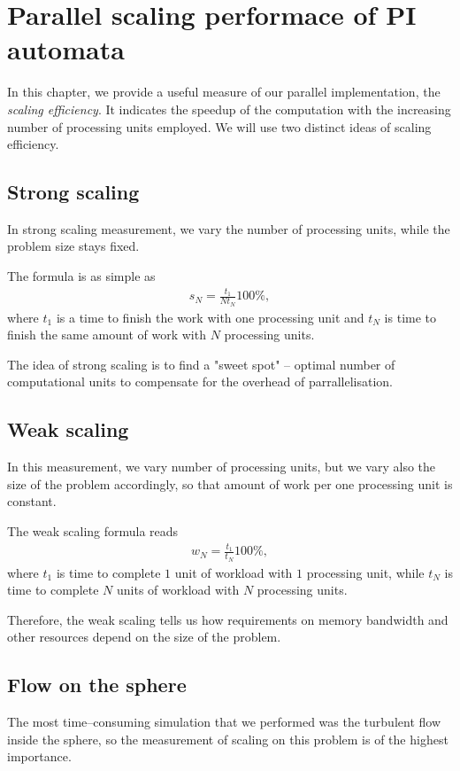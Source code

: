 \chapter{Parallel scaling performace of PI automata}
In this chapter, we provide a useful measure of our parallel implementation, the \textit{scaling efficiency}. It indicates the speedup of the computation with the increasing number of processing units employed.
We will use two distinct ideas of scaling efficiency.

\section{Strong scaling}
In strong scaling measurement, we vary the number of processing units, while the problem size stays fixed.

The formula is as simple as
\begin{align*}
s_N = \frac{t_1}{N t_N} 100\%,
\end{align*}
where $t_1$ is a time to finish the work with one processing unit and $t_N$ is time to finish the same amount of work with $N$ processing units.

The idea of strong scaling is to find a "sweet spot" -- optimal number of computational units to compensate for the overhead of parrallelisation.
\section{Weak scaling}
In this measurement, we vary number of processing units, but we vary also the size of the problem accordingly, so that amount of work per one processing unit is constant.

The weak scaling formula reads
\begin{align*}
w_N = \frac{t_1}{t_N} 100\%,
\end{align*}
where $t_1$ is time to complete $1$ unit of workload with $1$ processing unit, while $t_N$ is time to complete $N$ units of workload with $N$ processing units.

Therefore, the weak scaling tells us how requirements on memory bandwidth and other resources depend on the size of the problem.

\section{Flow on the sphere}
The most time--consuming simulation that we performed was the turbulent flow inside the sphere, so the measurement of scaling on this problem is of the highest importance.

